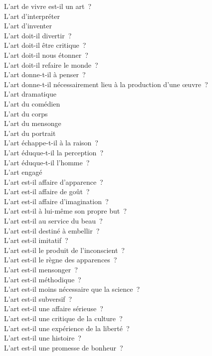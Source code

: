\documentclass[a4paper,12pt]{article}
\begin{document}
L'art de vivre est-il un art ? \\
L'art d'interpréter \\
L'art d'inventer \\
L'art doit-il divertir ? \\
L'art doit-il être critique ? \\
L'art doit-il nous étonner ? \\
L'art doit-il refaire le monde ? \\
L'art donne-t-il à penser ? \\
L'art donne-t-il nécessairement lieu à la production d'une œuvre ? \\
L'art dramatique \\
L'art du comédien \\
L'art du corps \\
L'art du mensonge \\
L'art du portrait \\
L'art échappe-t-il à la raison ? \\
L'art éduque-t-il la perception ? \\
L'art éduque-t-il l'homme ? \\
L'art engagé \\
L'art est-il affaire d'apparence ? \\
L'art est-il affaire de goût ? \\
L'art est-il affaire d'imagination ? \\
L'art est-il à lui-même son propre but ? \\
L'art est-il au service du beau ? \\
L'art est-il destiné à embellir ? \\
L'art est-il imitatif ? \\
L'art est-il le produit de l'inconscient ? \\
L'art est-il le règne des apparences ? \\
L'art est-il mensonger ? \\
L'art est-il méthodique ? \\
L'art est-il moins nécessaire que la science ? \\
L'art est-il subversif ? \\
L'art est-il une affaire sérieuse ? \\
L'art est-il une critique de la culture ? \\
L'art est-il une expérience de la liberté ? \\
L'art est-il une histoire ? \\
L'art est-il une promesse de bonheur ? \\
\end{document}
